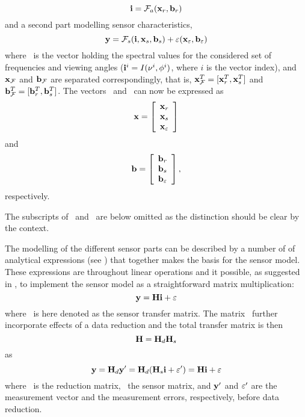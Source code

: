  \begin{equation}
   \mathbf{i} = \mathcal{F}_a(\mathbf{x}_r,\mathbf{b}_r)
  \label{eq:formalism:fma}
 \end{equation}
 and a second part modelling sensor characteristics,
 \begin{equation}
   \mathbf{y} = \mathcal{F}_s(\mathbf{i},\mathbf{x}_s,\mathbf{b}_s) + \varepsilon(\mathbf{x}_{\varepsilon},\mathbf{b}_{\varepsilon})
  \label{eq:formalism:fms}
 \end{equation}
 where \iv\ is the vector holding the spectral values for the
 considered set of frequencies and viewing angles
 ($\mathbf{i}^i=I(\nu^i,\phi^i)$, where $i$ is the vector index), and
 $\mathbf{x}_{\mathcal{F}}$ and $\mathbf{b}_{\mathcal{F}}$ are separated correspondingly, that is,
 $\mathbf{x}_{\mathcal{F}}^T= [\mathbf{x}_r^T,\mathbf{x}_s^T]$ and $\mathbf{b}_{\mathcal{F}}^T= [\mathbf{b}_r^T,\mathbf{b}_s^T]$.
 The vectors \xt\ and \bt\ can now be expressed as
 \begin{equation}
   \mathbf{x} = \left[ \begin{array}{c} \mathbf{x}_r\\ \mathbf{x}_s \\ \mathbf{x}_{\varepsilon} \end{array} \right]
 \end{equation}
 and
 \begin{equation}
   \mathbf{b} = \left[ \begin{array}{c} \mathbf{b}_r\\ \mathbf{b}_s \\ \mathbf{b}_{\varepsilon} \end{array}\right],
 \end{equation}
 respectively.

 The subscripts of \xt\ and \bt\ are below omitted as the distinction should be clear by the context. 



 \label{sec:formalism:sensor}
  
 The modelling of the different sensor parts can be described by a
 number of of analytical expressions (see \citet{eriksson:97a}) that
 together makes the basis for the sensor model. These expressions are
 throughout linear operations and it possible, as suggested in
 \citet{eriksson:00a}, to implement the sensor model as a
 straightforward matrix multiplication:
 \begin{equation}
   \mathbf{y} = \mathbf{H} \mathbf{i} + \varepsilon
  \label{eq:formalism:H}
 \end{equation}
 where \Hm\ is here denoted as the sensor transfer matrix.  The matrix
 \Hm\ further incorporate effects of a data reduction and
 the total transfer matrix is then
 \begin{equation}
   \mathbf{H} = \mathbf{H}_d \mathbf{H}_s
  \label{eq:formalism:Hs}
 \end{equation}
 as
 \begin{equation}
   \mathbf{y} = \mathbf{H}_d \mathbf{y}' = \mathbf{H}_d (\mathbf{H}_s \mathbf{i} + \varepsilon') = \mathbf{H} \mathbf{i} + \varepsilon
  \label{eq:formalism:datared}
 \end{equation}
 where \Hd\ is the reduction matrix, \Hs\ the sensor matrix, and $\mathbf{y}'$
 and $\varepsilon'$ are the measurement vector and the measurement errors,
 respectively, before data reduction. 



